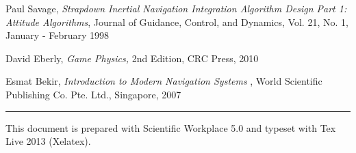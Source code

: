 \documentclass[12pt,a4paper]{article}
\begin{document}
\begin{thebibliography}{99}
 Paul Savage, \emph{Strapdown Inertial Navigation
Integration Algorithm Design Part 1: Attitude Algorithms}, Journal of
Guidance, Control, and Dynamics, Vol. 21, No. 1, January - February 1998

 David Eberly, \emph{Game Physics,} 2nd Edition, CRC Press,
2010

 Esmat Bekir, \emph{Introduction to Modern Navigation Systems}%
, World Scientific Publishing Co. Pte. Ltd., Singapore, 2007
\end{thebibliography}

\bigskip

\null
\vfill

\begin{center}
\rule{6in}{0.01in}
\end{center}

\noindent This document is prepared with Scientific Workplace 5.0 and
typeset with Tex Live 2013 (Xelatex).

\noindent\href{http://whymranderson.blogspot.tw/2014/03/how-to-convert-swp-50-special-unicode.html%
}{\underline{\color{blue}}}

\noindent\href{https://drive.google.com/file/d/0B96HmLH-SQVmM1dvYlFiQm9ESGM/edit?usp=sharing%
}{\underline{\color{blue}%
%
}}

\bigskip

%
\end{document}
